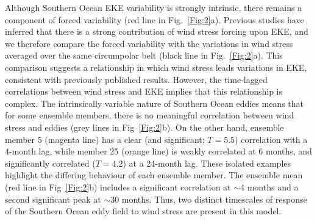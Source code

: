 \documentclass[linenumbers]{agujournal2019}
\begin{document}
Although Southern Ocean EKE variability is strongly intrinsic, there remains a component of forced variability (red line in Fig.~\ref{Fig:2}a).
Previous studies have inferred that there is a strong contribution of wind stress forcing upon EKE, and we therefore compare the forced variability with the variations in wind stress averaged over the same circumpolar belt (black line in Fig.~\ref{Fig:2}a).
This comparison suggests a relationship in which wind stress leads variations in EKE, consistent with previously published results.
However, the time-lagged correlations between wind stress and EKE implies that this relationship is complex. 
The intrinsically variable nature of Southern Ocean eddies means that for some ensemble members, there is no meaningful correlation between wind stress and eddies (grey lines in Fig~\ref{Fig:2}b).
On the other hand, ensemble member 5 (magenta line) has a clear (and significant; $T = 5.5$) correlation with a 4-month lag, while member 25 (orange line) is weakly correlated at 6 months, and significantly correlated ($T = 4.2$) at a 24-month lag.
These isolated examples highlight the differing behaviour of each ensemble member. 
The ensemble mean (red line in Fig~\ref{Fig:2}b) includes a significant correlation at $\sim$4 months and a second significant peak at $\sim$30 months.
Thus, two distinct timescales of response of the Southern Ocean eddy field to wind stress are present in this model. 
\end{document}
